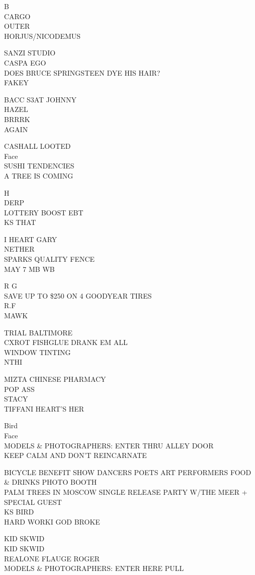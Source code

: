 \documentclass[10pt,letterpaper]{article}
\begin{document}
B\\
CARGO\\
OUTER\\
HORJUS/NICODEMUS

SANZI STUDIO\\
CASPA EGO\\
DOES BRUCE SPRINGSTEEN DYE HIS HAIR?\\
FAKEY

BACC S3AT JOHNNY\\
HAZEL\\
BRRRK\\
AGAIN

CASHALL LOOTED\\
Face\\
SUSHI TENDENCIES\\
A TREE IS COMING

H\\
DERP\\
LOTTERY BOOST EBT\\
KS THAT

I HEART GARY\\
NETHER\\
SPARKS QUALITY FENCE\\
MAY 7 MB WB

R G\\
SAVE UP TO \$250 ON 4 GOODYEAR TIRES\\
R.F\\
MAWK

TRIAL BALTIMORE\\
CXROT FISHGLUE DRANK EM ALL\\
WINDOW TINTING\\
NTHI

MIZTA CHINESE PHARMACY\\
POP ASS\\
STACY\\
TIFFANI HEART'S HER

Bird\\
Face\\
MODELS \& PHOTOGRAPHERS: ENTER THRU ALLEY DOOR\\
KEEP CALM AND DON'T REINCARNATE

BICYCLE BENEFIT SHOW DANCERS POETS ART PERFORMERS FOOD \& DRINKS PHOTO BOOTH\\
PALM TREES IN MOSCOW SINGLE RELEASE PARTY W/THE MEER + SPECIAL GUEST\\
KS BIRD\\
HARD WORKI GOD BROKE

KID SKWID\\
KID SKWID\\
REALONE FLAUGE ROGER\\
MODELS \& PHOTOGRAPHERS: ENTER HERE PULL
\end{document}
